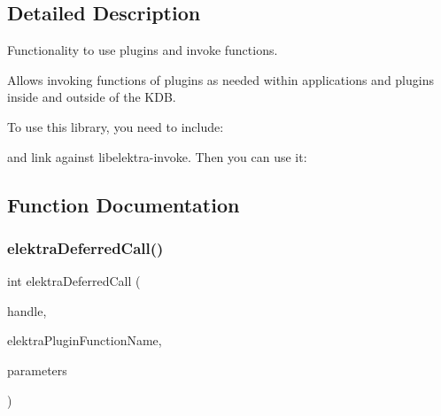 \subsection{Detailed Description}
Functionality to use plugins and invoke functions. 

Allows invoking functions of plugins as needed within applications and plugins inside and outside of the K\+DB.

To use this library, you need to include\+:


\begin{DoxyCode}{0}
\end{DoxyCode}


and link against {\ttfamily libelektra-\/invoke}. Then you can use it\+:


\begin{DoxyCode}{0}
\end{DoxyCode}
 

\subsection{Function Documentation}
\mbox{\label{group__invoke_ga80328407d9d418af04c54ab5f10a63c0}} 
\subsubsection{\texorpdfstring{elektraDeferredCall()}{elektraDeferredCall()}}
{\footnotesize\ttfamily int elektra\+Deferred\+Call (\begin{DoxyParamCaption}\item[{Plugin $\ast$}]{handle,  }\item[{const char $\ast$}]{elektra\+Plugin\+Function\+Name,  }\item[{Key\+Set $\ast$}]{parameters }\end{DoxyParamCaption})}




